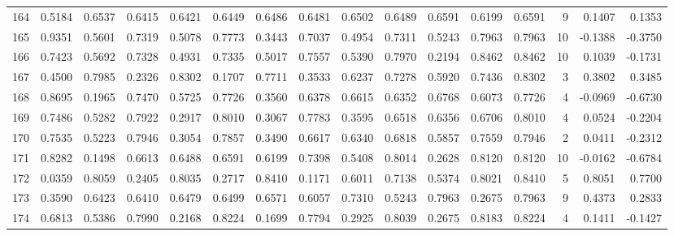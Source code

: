 \begin{tabular}{lrrrrrrrrrrrrrrr}
164 &      0.5184 &  0.6537 &  0.6415 &  0.6421 &  0.6449 &  0.6486 &  0.6481 &  0.6502 &  0.6489 &  0.6591 &   0.6199 &     0.6591 &      9 &                    0.1407 &                     0.1353 \\
165 &      0.9351 &  0.5601 &  0.7319 &  0.5078 &  0.7773 &  0.3443 &  0.7037 &  0.4954 &  0.7311 &  0.5243 &   0.7963 &     0.7963 &     10 &                   -0.1388 &                    -0.3750 \\
166 &      0.7423 &  0.5692 &  0.7328 &  0.4931 &  0.7335 &  0.5017 &  0.7557 &  0.5390 &  0.7970 &  0.2194 &   0.8462 &     0.8462 &     10 &                    0.1039 &                    -0.1731 \\
167 &      0.4500 &  0.7985 &  0.2326 &  0.8302 &  0.1707 &  0.7711 &  0.3533 &  0.6237 &  0.7278 &  0.5920 &   0.7436 &     0.8302 &      3 &                    0.3802 &                     0.3485 \\
168 &      0.8695 &  0.1965 &  0.7470 &  0.5725 &  0.7726 &  0.3560 &  0.6378 &  0.6615 &  0.6352 &  0.6768 &   0.6073 &     0.7726 &      4 &                   -0.0969 &                    -0.6730 \\
169 &      0.7486 &  0.5282 &  0.7922 &  0.2917 &  0.8010 &  0.3067 &  0.7783 &  0.3595 &  0.6518 &  0.6356 &   0.6706 &     0.8010 &      4 &                    0.0524 &                    -0.2204 \\
170 &      0.7535 &  0.5223 &  0.7946 &  0.3054 &  0.7857 &  0.3490 &  0.6617 &  0.6340 &  0.6818 &  0.5857 &   0.7559 &     0.7946 &      2 &                    0.0411 &                    -0.2312 \\
171 &      0.8282 &  0.1498 &  0.6613 &  0.6488 &  0.6591 &  0.6199 &  0.7398 &  0.5408 &  0.8014 &  0.2628 &   0.8120 &     0.8120 &     10 &                   -0.0162 &                    -0.6784 \\
172 &      0.0359 &  0.8059 &  0.2405 &  0.8035 &  0.2717 &  0.8410 &  0.1171 &  0.6011 &  0.7138 &  0.5374 &   0.8021 &     0.8410 &      5 &                    0.8051 &                     0.7700 \\
173 &      0.3590 &  0.6423 &  0.6410 &  0.6479 &  0.6499 &  0.6571 &  0.6057 &  0.7310 &  0.5243 &  0.7963 &   0.2675 &     0.7963 &      9 &                    0.4373 &                     0.2833 \\
174 &      0.6813 &  0.5386 &  0.7990 &  0.2168 &  0.8224 &  0.1699 &  0.7794 &  0.2925 &  0.8039 &  0.2675 &   0.8183 &     0.8224 &      4 &                    0.1411 &                    -0.1427 \\

\end{tabular}
